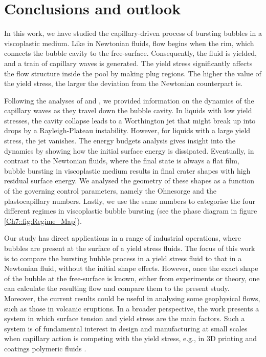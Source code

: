\section{Conclusions and outlook}\label{Sec::Conclusion}
In this work, we have studied the capillary-driven process of bursting bubbles in a viscoplastic medium. Like in Newtonian fluids, flow begins when the rim, which connects the bubble cavity to the free-surface. Consequently, the fluid is yielded, and a train of capillary waves is generated. The yield stress significantly affects the flow structure inside the pool by making plug regions. The higher the value of the yield stress, the larger the deviation from the Newtonian counterpart is. 

Following the analyses of \citet{deike2018dynamics} and \citet{gordillo2019capillary}, we provided information on the dynamics of the capillary waves as they travel down the bubble cavity. In liquids with low yield stresses, the cavity collapse leads to a Worthington jet that might break up into drops by a Rayleigh-Plateau instability. However, for liquids with a large yield stress, the jet vanishes. The energy budgets analysis gives insight into the dynamics by showing how the initial surface energy is dissipated. Eventually, in contrast to the Newtonian fluids, where the final state is always a flat film, bubble bursting in viscoplastic medium results in final crater shapes with high residual surface energy. We analysed the geometry of these shapes as a function of the governing control parameters, namely the Ohnesorge and the plastocapillary numbers. Lastly, we use the same numbers to categorise the four different regimes in viscoplastic bubble bursting (see the phase diagram in figure \ref{Ch7::fig:Regime_Map}).

Our study has direct applications in a range of industrial operations, where bubbles are present at the surface of a yield stress fluids. The focus of this work is to compare the bursting bubble process in a yield stress fluid to that in a Newtonian fluid, without the initial shape effects. However, once the exact shape of the bubble at the free-surface is known, either from experiments or theory, one can calculate the resulting flow and compare them to the present study. Moreover, the current results could be useful in analysing some geophysical flows, such as those in volcanic eruptions. In a broader perspective, the work presents a system in which surface tension and yield stress are the main factors. Such a system is of fundamental interest in design and manufacturing at small scales when capillary action is competing with the yield stress, e.g., in 3D printing and coatings polymeric fluids \citep{rauzan2018particle, nelson2019designing, jalaal2019laser, jalaal2021spreading}.

